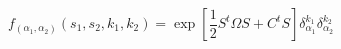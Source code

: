 \begin{equation} \label{thetat4}
f_{(\alpha_1 , \alpha_2 )} (s_1 , s_2 , k_1, k_2 ) = \exp [
\frac{1}{2} S^t \Omega S + C^t S ] \delta_{\alpha_1}^{k_1}
\delta_{\alpha_2}^{k_2}
\end{equation}


